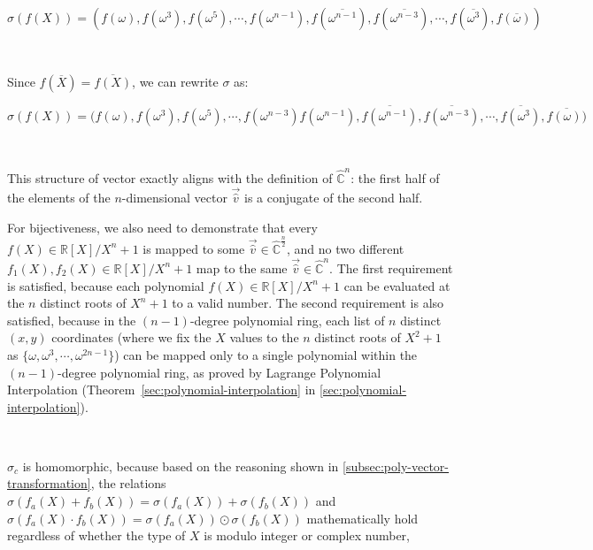 $\sigma(f(X)) = (f(\omega),f(\omega^3),f(\omega^5), \cdots, f(\omega^{n-1}), f(\overline{\omega^{n-1}}), f(\overline{\omega^{n-3}}), \cdots, f(\overline{\omega^3}), f(\overline{\omega}))$

$ $

Since $f(\overline{X}) = \overline{f(X)}$, we can rewrite $\sigma$ as: 

$\sigma(f(X)) = (f(\omega),f(\omega^3),f(\omega^5), \cdots, f(\omega^{n-3}) f(\omega^{n-1}), \overline{f(\omega^{n-1})}, \overline{f(\omega^{n-3})}, \cdots, \overline{f(\omega^3)}, \overline{f(\omega))}$

$ $

This structure of vector exactly aligns with the definition of $\hat{\mathbb{C}}^n$: the first half of the elements of the $n$-dimensional vector $\vec{\hat v}$ is a conjugate of the second half.

For bijectiveness, we also need to demonstrate that every $f(X) \in \mathbb{R}[X] /X^n + 1$ is mapped to some $\vec{\hat v} \in \hat{\mathbb{C}}^{\frac{n}{2}}$, and no two different $f_1(X), f_2(X) \in \mathbb{R}[X] / X^n + 1$ map to the same $\vec{\hat v} \in \hat{\mathbb{C}}^{n}$. The first requirement is satisfied, because each polynomial $f(X) \in \mathbb{R}[X] /X^n + 1$ can be evaluated at the $n$ distinct roots of $X^n + 1$ to a valid number. The second requirement is also satisfied, because in the $(n-1)$-degree polynomial ring, each list of $n$ distinct $(x, y)$ coordinates (where we fix the $X$ values to the $n$ distinct roots of $X^2 + 1$ as $\{\omega, \omega^3, \cdots, \omega^{2n - 1}\}$) can be mapped only to a single polynomial within the $(n-1)$-degree polynomial ring, as proved by Lagrange Polynomial Interpolation (Theorem~\ref*{sec:polynomial-interpolation} in \autoref{sec:polynomial-interpolation}).

$ $


 $\sigma_c$ is homomorphic, because based on the reasoning shown in \autoref{subsec:poly-vector-transformation}, the relations $\sigma(f_a(X) + f_b(X)) = \sigma(f_a(X)) + \sigma(f_b(X))$ and $\sigma(f_a(X) \cdot f_b(X)) = \sigma(f_a(X)) \odot \sigma(f_b(X))$ mathematically hold regardless of whether the type of $X$ is modulo integer or complex number, 

